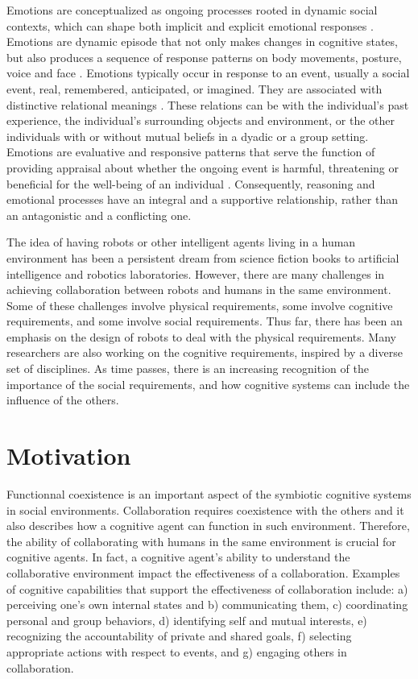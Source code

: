 \documentclass[letterpaper]{article}
\begin{document}
Emotions are conceptualized as ongoing processes rooted in dynamic social
contexts, which can shape both implicit and explicit emotional responses
\cite{parkinson:emotion-social-interaction}. Emotions are dynamic episode that
not only makes changes in cognitive states, but also produces a sequence of
response patterns on body movements, posture, voice and face
\cite{scherer:expression-appraisal}. Emotions typically occur in response to an
event, usually a social event, real, remembered, anticipated, or imagined. They
are associated with distinctive relational meanings
\cite{parkinson:holds-emotion}. These relations can be with the individual's
past experience, the individual's surrounding objects and environment, or the
other individuals with or without mutual beliefs in a dyadic or a group setting.
Emotions are evaluative and responsive patterns that serve the function of
providing appraisal about whether the ongoing event is harmful, threatening or
beneficial for the well-being of an individual \cite{zhu:emotion-action}.
Consequently, reasoning and emotional processes have an integral and a
supportive relationship, rather than an antagonistic and a conflicting one.

The idea of having robots or other intelligent agents living in a human
environment has been a persistent dream from science fiction books to artificial
intelligence and robotics laboratories. However, there are many challenges in
achieving collaboration between robots and humans in the same environment. Some
of these challenges involve physical requirements, some involve cognitive
requirements, and some involve social requirements. Thus far, there has been an
emphasis on the design of robots to deal with the physical requirements. Many
researchers are also working on the cognitive requirements, inspired by a
diverse set of disciplines. As time passes, there is an increasing recognition
of the importance of the social requirements, and how cognitive systems can
include the influence of the others.

\section{Motivation}

Functionnal coexistence is an important aspect of the symbiotic cognitive
systems in social environments. Collaboration requires coexistence with
the others and it also describes how a cognitive agent can function in such
environment. Therefore, the ability of collaborating with humans in the same
environment is crucial for cognitive agents. In fact, a cognitive agent's
ability to understand the collaborative environment impact the effectiveness of a
collaboration. Examples of cognitive capabilities that support the effectiveness
of collaboration include: a) perceiving one's own internal states and b)
communicating them, c) coordinating personal and group behaviors, d) identifying
self and mutual interests, e) recognizing the accountability of private and
shared goals, f) selecting appropriate actions with respect to events, and g)
engaging others in collaboration.
\end{document}
